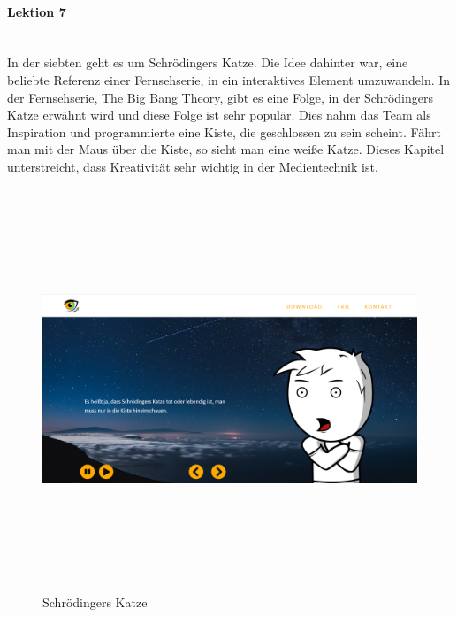 \paragraph{Lektion 7} \leavevmode \\
In der siebten geht es um Schrödingers Katze. Die Idee dahinter war, eine beliebte Referenz einer Fernsehserie, in ein interaktives Element umzuwandeln. In der Fernsehserie, The Big Bang Theory, gibt es eine Folge, in der Schrödingers Katze erwähnt wird und diese Folge ist sehr populär. Dies nahm das Team als Inspiration und programmierte eine Kiste, die geschlossen zu sein scheint. Fährt man mit der Maus über die Kiste, so sieht man eine weiße Katze. Dieses Kapitel unterstreicht, dass Kreativität sehr wichtig in der Medientechnik ist.
\begin{figure}[h]
	\centering
\includegraphics[width=12cm,height=12cm,keepaspectratio]{webseite_abb18} 
	\caption{Schrödingers Katze}
\end{figure}
